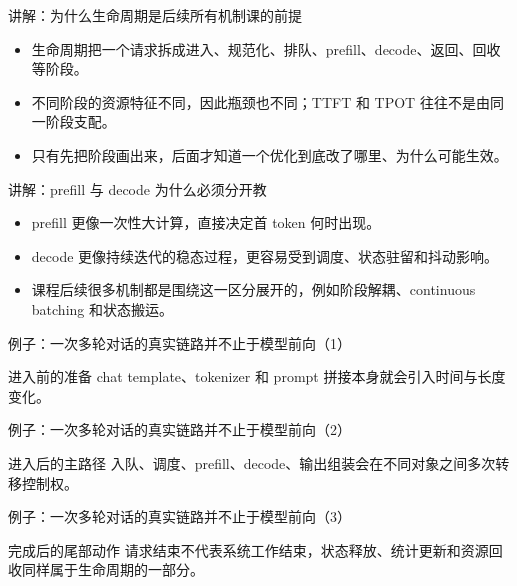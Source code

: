 \begin{frame}{讲解：为什么生命周期是后续所有机制课的前提}
  \begin{itemize}
    \item 生命周期把一个请求拆成进入、规范化、排队、prefill、decode、返回、回收等阶段。
    \item 不同阶段的资源特征不同，因此瓶颈也不同；TTFT 和 TPOT 往往不是由同一阶段支配。
    \item 只有先把阶段画出来，后面才知道一个优化到底改了哪里、为什么可能生效。
  \end{itemize}
\end{frame}

\begin{frame}{讲解：prefill 与 decode 为什么必须分开教}
  \begin{itemize}
    \item prefill 更像一次性大计算，直接决定首 token 何时出现。
    \item decode 更像持续迭代的稳态过程，更容易受到调度、状态驻留和抖动影响。
    \item 课程后续很多机制都是围绕这一区分展开的，例如阶段解耦、continuous batching 和状态搬运。
  \end{itemize}
\end{frame}

\begin{frame}{例子：一次多轮对话的真实链路并不止于模型前向（1）}
\begin{block}{进入前的准备}
    chat template、tokenizer 和 prompt 拼接本身就会引入时间与长度变化。
  \end{block}
\end{frame}

\begin{frame}{例子：一次多轮对话的真实链路并不止于模型前向（2）}
\begin{block}{进入后的主路径}
    入队、调度、prefill、decode、输出组装会在不同对象之间多次转移控制权。
  \end{block}
\end{frame}

\begin{frame}{例子：一次多轮对话的真实链路并不止于模型前向（3）}
\begin{block}{完成后的尾部动作}
    请求结束不代表系统工作结束，状态释放、统计更新和资源回收同样属于生命周期的一部分。
  \end{block}
\end{frame}

